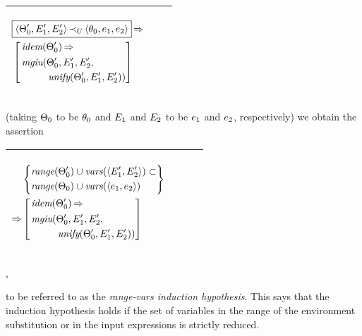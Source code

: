 \documentclass[runningheads]{llncs}
\DeclareMathOperator{\uimplies}{\Rightarrow}
\DeclareMathOperator{\unify}{\emph{unify}}
\DeclareMathOperator{\idem}{\emph{idem}}
\DeclareMathOperator{\mgiu}{\emph{mgiu}}
\begin{document}
  \begin{center}
  \begin{tabular}{|m{}|m{}||m{}|}
\hline
\begin{center}
{$\begin{aligned}
&\boxed{\langle\Thet{0}', \E{1}', \E{2}'\rangle \, \expsub{\prec}{U} \, \langle\thet{0}, \e{1}, \e{2}\rangle} \uimplies \\
&\left[\begin{aligned}&\idem(\Thet{0}') \uimplies \\
 &\begin{aligned}
    {\,\mgiu}(&\Thet{0}', \E{1}', \E{2}', \\
    &\unify(\Thet{0}', \E{1}', \E{2}')) 
\end{aligned}
\end{aligned}\right]\end{aligned}$} \hspace{1cm} 
\end{center}& &  \\  \hline
\end{tabular}
\end{center}
(taking $\Theta_{0}$ to be $\theta_{0}$ and $E_{1}$ and $E_{2}$ to be $e_{1}$ and $e_{2}$, respectively)  we obtain the assertion
 \begin{center}
  \begin{tabular}{|m{}|m{}||m{}|}
\hline
\begin{center}
{$\begin{aligned}
 &\begin{aligned}
& \left\{\begin{aligned}
&\range(\Thet{0}')\cup\vars(\langle  \E{1}', \E{2}' \rangle) \subset \\
  &\range(\Thet{0})\cup\vars(\langle \e{1}, \e{2} \rangle) 
  \end{aligned}\right\} 
\end{aligned} \\
\uimplies  &\left[\begin{aligned}&\idem(\Thet{0}') \uimplies \\
  &\begin{aligned}
    {\,\mgiu}(&\Thet{0}', \E{1}', \E{2}', \\
    &\unify(\Thet{0}', \E{1}', \E{2}')) 
\end{aligned}
\end{aligned}\right] \end{aligned}  $}  \hspace{1cm} 
\end{center}& &  \\  \hline
\end{tabular},
\end{center}
to be referred to as the \emph{range-vars induction hypothesis}. This says that the induction hypothesis holds if the set of variables in the range of the environment substitution or in the input expressions is strictly reduced.
\end{document}
